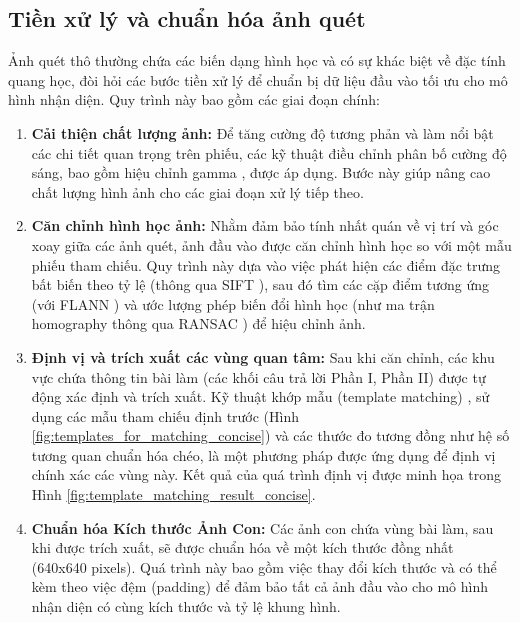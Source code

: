 \subsection{Tiền xử lý và chuẩn hóa ảnh quét}
\label{subsec:tien_xu_ly_anh_quet_with_templates_concise}

Ảnh quét thô thường chứa các biến dạng hình học và có sự khác biệt về đặc tính quang học, đòi hỏi các bước tiền xử lý để chuẩn bị dữ liệu đầu vào tối ưu cho mô hình nhận diện. Quy trình này bao gồm các giai đoạn chính:

\begin{enumerate}
    \item \textbf{Cải thiện chất lượng ảnh:}
    Để tăng cường độ tương phản và làm nổi bật các chi tiết quan trọng trên phiếu, các kỹ thuật điều chỉnh phân bố cường độ sáng, bao gồm hiệu chỉnh gamma \citep{Poynton1996}, được áp dụng. Bước này giúp nâng cao chất lượng hình ảnh cho các giai đoạn xử lý tiếp theo.

    \item \textbf{Căn chỉnh hình học ảnh:}
    Nhằm đảm bảo tính nhất quán về vị trí và góc xoay giữa các ảnh quét, ảnh đầu vào được căn chỉnh hình học so với một mẫu phiếu tham chiếu. Quy trình này dựa vào việc phát hiện các điểm đặc trưng bất biến theo tỷ lệ (thông qua SIFT \citep{Lowe2004}), sau đó tìm các cặp điểm tương ứng (với FLANN \citep{Muja2009}) và ước lượng phép biến đổi hình học (như ma trận homography thông qua RANSAC \citep{Fischler1981}) để hiệu chỉnh ảnh.

    \item \textbf{Định vị và trích xuất các vùng quan tâm:}
    Sau khi căn chỉnh, các khu vực chứa thông tin bài làm (các khối câu trả lời Phần I, Phần II) được tự động xác định và trích xuất. Kỹ thuật khớp mẫu (template matching) \citep{Brunelli2009TemplateMatching}, sử dụng các mẫu tham chiếu định trước (Hình \ref{fig:templates_for_matching_concise}) và các thước đo tương đồng như hệ số tương quan chuẩn hóa chéo, là một phương pháp được ứng dụng để định vị chính xác các vùng này. Kết quả của quá trình định vị được minh họa trong Hình \ref{fig:template_matching_result_concise}.

    \item \textbf{Chuẩn hóa Kích thước Ảnh Con:}
    Các ảnh con chứa vùng bài làm, sau khi được trích xuất, sẽ được chuẩn hóa về một kích thước đồng nhất (640x640 pixels). Quá trình này bao gồm việc thay đổi kích thước và có thể kèm theo việc đệm (padding) để đảm bảo tất cả ảnh đầu vào cho mô hình nhận diện có cùng kích thước và tỷ lệ khung hình.
\end{enumerate}

